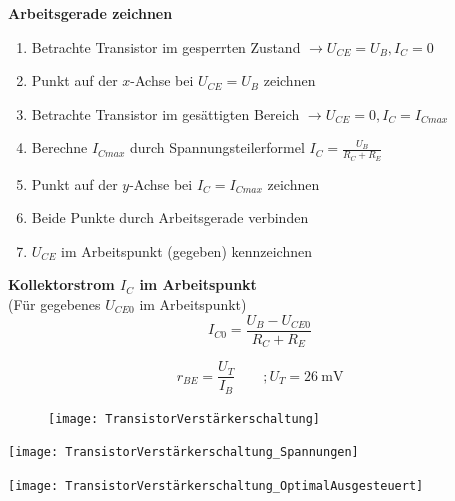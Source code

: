 \documentclass[a5paper, 12pt, twoside]{scrartcl}
\begin{document}
\textbf{Arbeitsgerade zeichnen}\\
\begin{enumerate}
\item Betrachte Transistor im gesperrten Zustand \(\rightarrow U_{CE} = U_B, I_C = 0\)
\item Punkt auf der \(x\)-Achse bei \(U_{CE} = U_B\) zeichnen
\item Betrachte Transistor im gesättigten Bereich \(\rightarrow U_{CE} = 0, I_C = I_{Cmax}\)
\item Berechne \(I_{Cmax}\) durch Spannungsteilerformel \(I_C = \frac{U_B}{R_C + R_E}\)
\item Punkt auf der \(y\)-Achse bei \(I_C = I_{Cmax}\) zeichnen
\item Beide Punkte durch Arbeitsgerade verbinden
\item \(U_{CE}\) im Arbeitspunkt (gegeben) kennzeichnen
\end{enumerate}

\textbf{Kollektorstrom \(I_C\) im Arbeitspunkt}\\
(Für gegebenes \(U_{CE0}\) im Arbeitspunkt)
\[I_{C0} = \frac{U_B - U_{CE0}}{R_C + R_E}\]

\[r_{BE} = \frac{U_T}{I_B} \qquad; U_T = \SI{26}{\milli\volt}\]

\begin{figure}[H]
  \centering
  \texttt{[image: TransistorVerstärkerschaltung]}
\end{figure}

\begin{minipage}{.5\linewidth}
  {\centering
    \texttt{[image: TransistorVerstärkerschaltung\_Spannungen]}
    \par%
  }
\end{minipage}%
\begin{minipage}{.5\linewidth}
  {\centering
    \texttt{[image: TransistorVerstärkerschaltung\_OptimalAusgesteuert]}
    \par%
  }
\end{minipage}
\end{document}
